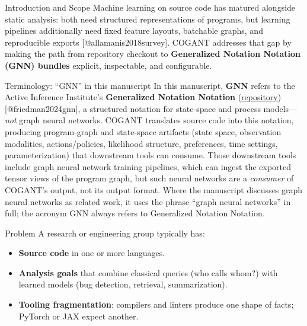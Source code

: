 \documentclass[
  ignorenonframetext,
]{beamer}
\author{\texorpdfstring{}{}}
\date{}
\providecommand{\tightlist}{%
  \setlength{\itemsep}{0pt}\setlength{\parskip}{0pt}}
\begin{document}
\begin{frame}[fragile]{Introduction and Scope}
\protect{}\label{introduction-and-scope}
Machine learning on source code has matured alongside static analysis:
both need structured representations of programs, but learning pipelines
additionally need fixed feature layouts, batchable graphs, and
reproducible exports {[}@allamanis2018survey{]}. COGANT addresses that
gap by making the path from repository checkout to \textbf{Generalized
Notation Notation (GNN) bundles} explicit, inspectable, and
configurable.

\begin{block}{Terminology: ``GNN'' in this manuscript}
\protect{}\label{terminology-gnn-in-this-manuscript}
In this manuscript, \textbf{GNN} refers to the Active Inference
Institute's \textbf{Generalized Notation Notation}
(\href{https://github.com/ActiveInferenceInstitute/GeneralizedNotationNotation}{repository})
{[}@friedman2024gnn{]}, a structured notation for state-space and
process models---\emph{not} graph neural networks. COGANT translates
source code into this notation, producing program-graph and state-space
artifacts (state space, observation modalities, actions/policies,
likelihood structure, preferences, time settings, parameterization) that
downstream tools can consume. Those downstream tools include graph
neural network training pipelines, which can ingest the exported tensor
views of the program graph, but such neural networks are a
\emph{consumer} of COGANT's output, not its output format. Where the
manuscript discusses graph neural networks as related work, it uses the
phrase ``graph neural networks'' in full; the acronym GNN always refers
to Generalized Notation Notation.
\end{block}

\begin{block}{Problem}
\protect{}\label{problem}
A research or engineering group typically has:

\begin{itemize}
\tightlist
\item
  \textbf{Source code} in one or more languages.
\item
  \textbf{Analysis goals} that combine classical queries (who calls
  whom?) with learned models (bug detection, retrieval, summarization).
\item
  \textbf{Tooling fragmentation}: compilers and linters produce one
  shape of facts; PyTorch or JAX expect another.
\end{itemize}


\end{block}
\end{frame}
\end{document}
